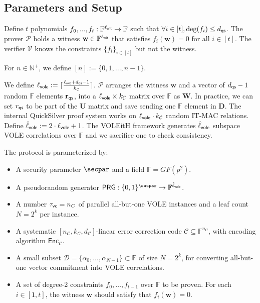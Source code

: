 \documentclass[11pt,a4paper]{article}
\theoremstyle{definition}
\theoremstyle{remark}
\newcommand{\F}{\mathbb{F}}
\newcommand{\calC}{\mathcal{C}}
\newcommand{\calD}{\mathcal{D}}
\newcommand{\calP}{\mathcal{P}}
\newcommand{\calV}{\mathcal{V}}
\newcommand{\mat}[1]{\mathbf{#1}}
\renewcommand{\vec}[1]{\mathbf{#1}}
\begin{document}
\subsection{Parameters and Setup}

Define $t$ polynomials $f_0, ..., f_{t} : \F^{\ell_{\sf wit}} \to \F$
such that $\forall i \in [t], \deg(f_i) \leq d_{\sf qs}$.
The prover $\calP$ holds a witness $\vec{w} \in \F^{\ell_{\sf wit}}$ that satisfies
$f_i(\vec{w}) = 0$ for all $i \in [t]$.
The verifier $\calV$ knows the constraints $\{ f_i \}_{i \in [t]}$ but not the witness.

For $n \in \mathbb{N}^+$, we define $[n] := \{ 0, 1, ..., n-1 \}$.

We define $\ell_{\sf vole} := \lceil \frac{\ell_{\sf wit} + d_{\sf qs} - 1}{k_{\calC}} \rceil$.
$\calP$ arranges the witness $\vec{w}$ 
and a vector of $d_{\sf qs} - 1$ random $\F$ elements $\vec{r}_{\sf qs}$,
into a $\ell_{\sf vole} \times k_{\calC}$ matrix over $\F$ as $\mat{W}$.
In practice, we can set $r_{\sf qs}$ to be part of the $\mat{U}$ matrix and save sending one $\F$ element in $\mat{D}$.
The internal QuickSilver proof system works on $\ell_{\sf vole} \cdot k_{\calC}$ random IT-MAC relations.
Define $\hat{\ell}_{\sf vole} := 2 \cdot \ell_{\sf vole} + 1$.
The VOLEitH framework generates $\hat{\ell}_{\sf vole}$ subspace VOLE correlations over $\F$ and we sacrifice one to check consistency.



The protocol is parameterized by:
\begin{itemize}
	\item A security parameter $\secpar$ and a field $\F = {GF}(p^2)$.
	\item A pseudorandom generator $\mathsf{PRG}: \{0,1\}^{\secpar} \to \F^{\hat{\ell}_{\sf vole}}$.
	\item A number $\tau_{\sf vc} = n_C$ of parallel all-but-one VOLE instances and
		a leaf count $N = 2^k$ per instance.
	\item A systematic $[n_{\calC}, k_{\calC}, d_{\calC}]$-linear error correction code
		$\calC \subseteq \F^{n_C}$, with encoding algorithm
		$\mathsf{Enc}_{\calC}$.
	\item A small subset
		$\calD = \{\alpha_0, \dots, \alpha_{N-1}\} \subset \F$
		of size $N = 2^k$, for converting all-but-one vector commitment into VOLE correlations.
	\item A set of degree-2 constraints $f_0, \dots, f_{t-1}$ over $\F$ to be proven. For each $i \in [1, t]$, the witness $\vec{w}$ should satisfy that $f_i (\vec{w}) = 0$.
\end{itemize}
\end{document}
